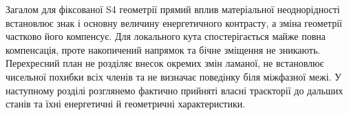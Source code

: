 Загалом для фіксованої S4 геометрії прямий вплив матеріальної неоднорідності встановлює знак і основну величину енергетичного контрасту, а зміна геометрії частково його компенсує. Для локального кута спостерігається майже повна компенсація, проте накопичений напрямок та бічне зміщення не зникають. Перехресний план не розділяє внесок окремих змін ламаної, не встановлює чисельної похибки всіх членів та не визначає поведінку біля міжфазної межі. У наступному розділі розглянемо фактично прийняті власні траєкторії до дальших станів та їхні енергетичні й геометричні характеристики.
